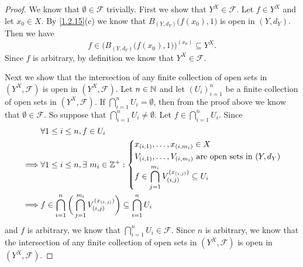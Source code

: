 \begin{proof}
  We know that \(\emptyset \in \mathcal{F}\) trivially.
  First we show that \(Y^X \in \mathcal{F}\).
  Let \(f \in Y^X\) and let \(x_0 \in X\).
  By \cref{1.2.15}(c) we know that \(B_{(Y, d_Y)}\big(f(x_0), 1\big)\) is open in \((Y, d_Y)\).
  Then we have
  \[
    f \in \Big(B_{(Y, d_Y)}\big(f(x_0), 1\big)\Big)^{(x_0)} \subseteq Y^X.
  \]
  Since \(f\) is arbitrary, by definition we know that \(Y^X \in \mathcal{F}\).

  Next we show that the intersection of any finite collection of open sets in \((Y^X, \mathcal{F})\) is open in \((Y^X, \mathcal{F})\).
  Let \(n \in \mathbb{N}\) and let \((U_i)_{i = 1}^n\) be a finite collection of open sets in \((Y^X, \mathcal{F})\).
  If \(\bigcap_{i = 1}^n U_i = \emptyset\), then from the proof above we know that \(\emptyset \in \mathcal{F}\).
  So suppose that \(\bigcap_{i = 1}^n U_i \neq \emptyset\).
  Let \(f \in \bigcap_{i = 1}^n U_i\).
  Since
  \begin{align*}
             & \forall 1 \leq i \leq n, f \in U_i                                                                                  \\
    \implies & \forall 1 \leq i \leq n, \exists\ m_i \in \mathbb{Z}^+ : \begin{dcases}
                                                                  x_{(i, 1)}, \dots, x_{(i, m_i)} \in X                              \\
                                                                  V_{(i, 1)}, \dots, V_{(i, m_i)} \text{ are open sets in } (Y, d_Y) \\
                                                                  f \in \bigcap_{j = 1}^{m_i} V_{(i, j)}^{(x_{(i, j)})} \subseteq U_i
                                                                \end{dcases} \\
    \implies & f \in \bigcap_{i = 1}^n \bigg(\bigcap_{j = 1}^{m_i} V_{(i, j)}^{(x_{(i, j)})}\bigg) \subseteq \bigcap_{i = 1}^n U_i
  \end{align*}
  and \(f\) is arbitrary, we know that \(\bigcap_{i = 1}^n U_i \in \mathcal{F}\).
  Since \(n\) is arbitrary, we know that the intersection of any finite collection of open sets in \((Y^X, \mathcal{F})\) is open in \((Y^X, \mathcal{F})\).


\end{proof}

